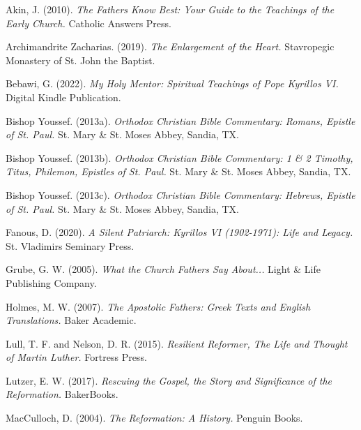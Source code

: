 \documentclass[12pt,doc]{apa7}   	%
\begin{document}
\begin{thebibliography}{15}

Akin, J. (2010). \emph{The Fathers Know Best: Your Guide to the Teachings of the Early Church.} Catholic Answers Press.
    
Archimandrite Zacharias. (2019). \emph{The Enlargement of the Heart.} Stavropegic Monastery of St. John the Baptist.

Bebawi, G. (2022). \emph{My Holy Mentor: Spiritual Teachings of Pope Kyrillos VI.} Digital Kindle Publication.

Bishop Youssef. (2013a). \emph{Orthodox Christian Bible Commentary: Romans, Epistle of St. Paul.} St. Mary \& St. Moses Abbey, Sandia, TX.

Bishop Youssef. (2013b). \emph{Orthodox Christian Bible Commentary: 1 \& 2 Timothy, Titus, Philemon, Epistles of St. Paul.} St. Mary \& St. Moses Abbey, Sandia, TX.

Bishop Youssef. (2013c). \emph{Orthodox Christian Bible Commentary: Hebrews, Epistle of St. Paul.} St. Mary \& St. Moses Abbey, Sandia, TX.


Fanous, D. (2020). \emph{A Silent Patriarch: Kyrillos VI (1902-1971): Life and Legacy.} St. Vladimirs Seminary Press.

Grube, G. W. (2005). \emph{What the Church Fathers Say About...} Light \& Life Publishing Company.

Holmes, M. W. (2007). \emph{The Apostolic Fathers: Greek Texts and English Translations.} Baker Academic.

Lull, T. F. and Nelson, D. R. (2015). \emph{Resilient Reformer, The Life and Thought of Martin Luther.} Fortress Press.

Lutzer, E. W. (2017). \emph{Rescuing the Gospel, the Story and Significance of the Reformation.} BakerBooks.

MacCulloch, D. (2004). \emph{The Reformation: A History.} Penguin Books.


\end{thebibliography}
\end{document}
